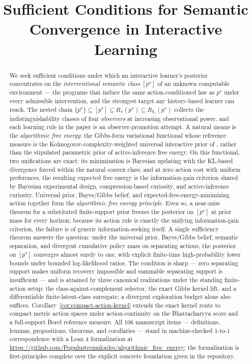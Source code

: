 \documentclass[11pt]{article}
\title{Sufficient Conditions for Semantic Convergence in Interactive Learning}
\author{}
\date{}
\theoremstyle{definition}
\theoremstyle{remark}
\begin{document}
\maketitle

\begin{abstract}
We seek sufficient conditions under which an interactive learner's posterior concentrates on the \emph{interventional semantic class} $[p^\star]$ of an unknown computable environment --- the programs that induce the same action-conditioned law as $p^\star$ under every admissible intervention, and the strongest target any history-based learner can reach. The nested chain $\{p^\star\}\subseteq[p^\star]\subseteq R_\pi(p^\star)\subseteq R_{h_t}(p^\star)$ collects the indistinguishability classes of four \emph{observers} at increasing observational power, and each learning rule in the paper is an observer-promotion attempt. A natural means is the \emph{algorithmic free energy}: the Gibbs-form variational functional whose reference measure is the Kolmogorov-complexity-weighted universal interactive prior of \citet{Solomonoff1964a,Solomonoff1964b,Kolmogorov1965,Hutter2005}, rather than the stipulated parametric prior of active-inference free energy. On this functional, two unifications are exact: its minimization is Bayesian updating with the KL-based divergence forced within the natural convex class; and at zero action cost with uniform preferences, the resulting expected free energy is the information-gain criterion shared by Bayesian experimental design, compression-based curiosity, and active-inference curiosity. Universal prior, Bayes/Gibbs belief, and expected-free-energy-minimizing action together form the \emph{algorithmic free energy principle}. Even so, a near-miss theorem for a substituted finite-support prior freezes the posterior on $[p^\star]$ at prior mass for every horizon; because its action rule is exactly the unifying information-gain criterion, the failure is of generic information-seeking itself. A single sufficiency theorem answers the question: under the universal prior, Bayes/Gibbs belief, semantic separation, and divergent cumulative policy mass on separating actions, the posterior on $[p^\star]$ converges almost surely to one, with explicit finite-time high-probability lower bounds under bounded log-likelihood ratios. The condition is sharp --- zero separating support makes uniform recovery impossible and summable separating support is insufficient --- and is attained by three canonical realizations under the standing finite-action setup: the class-against-complement selector, the exact Gibbs kernel lift, and a differentiable finite-latent-class surrogate; a divergent exploration budget alone also suffices. Corollary~\ref{cor:compact-action-kernel} extends the exact kernel route to compact metric action spaces under action-continuity on the Bhattacharyya score and a full-support Borel reference measure. All 106 manuscript items --- definitions, lemmas, propositions, theorems, and corollaries --- stand in machine-checked 1-to-1 correspondence with a Lean 4 formalization at \url{https://github.com/Populustremuloides/algorithmic_free_energy}; the formalization is first-principles complete over the explicit concrete foundation given in the repository.
\end{abstract}
\end{document}
